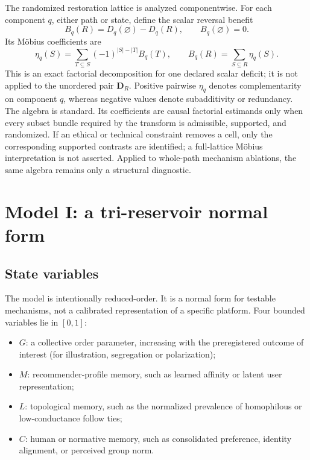 \documentclass[10pt,a4paper]{article}
\begin{document}
The randomized restoration lattice is analyzed componentwise. For each component $q$, either path or state, define the scalar reversal benefit
\begin{equation}
B_q(R)=D_q(\varnothing)-D_q(R),
\qquad B_q(\varnothing)=0.
\end{equation}
Its M\"obius coefficients are
\begin{equation}
\eta_q(S)=
\sum_{T\subseteq S}(-1)^{|S|-|T|}B_q(T),
\qquad
B_q(R)=\sum_{S\subseteq R}\eta_q(S).
\label{eq:mobius}
\end{equation}
This is an exact factorial decomposition for one declared scalar deficit; it is not applied to the unordered pair $\bm D_R$. Positive pairwise $\eta_q$ denotes complementarity on component $q$, whereas negative values denote subadditivity or redundancy. The algebra is standard. Its coefficients are causal factorial estimands only when every subset bundle required by the transform is admissible, supported, and randomized. If an ethical or technical constraint removes a cell, only the corresponding supported contrasts are identified; a full-lattice M\"obius interpretation is not asserted. Applied to whole-path mechanism ablations, the same algebra remains only a structural diagnostic.

\section{Model I: a tri-reservoir normal form}

\subsection{State variables}

The model is intentionally reduced-order. It is a normal form for testable mechanisms, not a calibrated representation of a specific platform. Four bounded variables lie in $[0,1]$:
\begin{itemize}
  \item $G$: a collective order parameter, increasing with the preregistered outcome of interest (for illustration, segregation or polarization);
  \item $M$: recommender-profile memory, such as learned affinity or latent user representation;
  \item $L$: topological memory, such as the normalized prevalence of homophilous or low-conductance follow ties;
  \item $C$: human or normative memory, such as consolidated preference, identity alignment, or perceived group norm.
\end{itemize}
\end{document}
